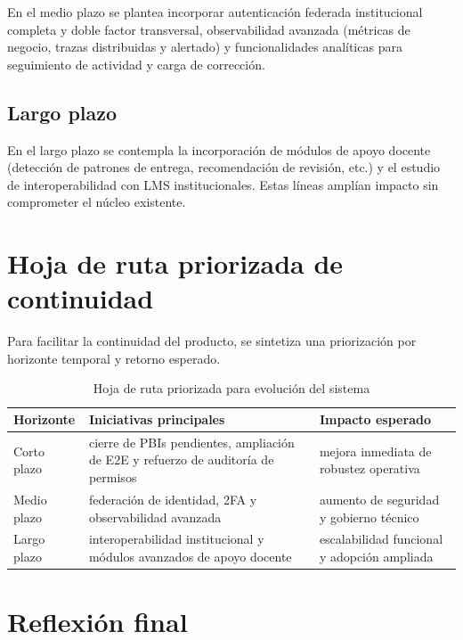 En el medio plazo se plantea incorporar autenticaci\'on federada institucional completa y doble factor transversal, observabilidad avanzada (m\'etricas de negocio, trazas distribuidas y alertado) y funcionalidades anal\'iticas para seguimiento de actividad y carga de correcci\'on.

\subsection{Largo plazo}

En el largo plazo se contempla la incorporaci\'on de m\'odulos de apoyo docente (detecci\'on de patrones de entrega, recomendaci\'on de revisi\'on, etc.) y el estudio de interoperabilidad con LMS institucionales. Estas l\'ineas ampl\'ian impacto sin comprometer el n\'ucleo existente.

\FloatBarrier
\section{Hoja de ruta priorizada de continuidad}

Para facilitar la continuidad del producto,
se sintetiza una priorizaci\'on por horizonte temporal y retorno esperado.

\begin{table}[!htbp]
\centering
\begin{tabular}{|P{2.5cm}|P{5.2cm}|P{3.8cm}|}
\hline
\textbf{Horizonte} & \textbf{Iniciativas principales} & \textbf{Impacto esperado} \\
\hline
Corto plazo & cierre de PBIs pendientes, ampliaci\'on de E2E y refuerzo de auditor\'ia de permisos & mejora inmediata de robustez operativa \\
\hline
Medio plazo & federaci\'on de identidad, 2FA y observabilidad avanzada & aumento de seguridad y gobierno t\'ecnico \\
\hline
Largo plazo & interoperabilidad institucional y m\'odulos avanzados de apoyo docente & escalabilidad funcional y adopci\'on ampliada \\
\hline
\end{tabular}
\caption{Hoja de ruta priorizada para evoluci\'on del sistema}
\label{tab:hoja-ruta-conclusiones}
\end{table}

\FloatBarrier
\section{Reflexi\'on final}

